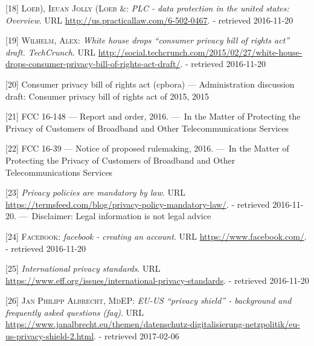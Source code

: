 \documentclass[12pt,english,a4paper,titlepage,cleardoublepage=empty,dottedtoc]{report}
\begin{document}
\hypertarget{ref-web_2016_data-protection-laws-in-the-us}{}
{[}18{]} \textsc{Loeb), Ieuan Jolly (Loeb \&}: \emph{PLC - data
protection in the united states: Overview}. URL
\url{http://us.practicallaw.com/6-502-0467}. - retrieved 2016-11-20

\hypertarget{ref-web_2015_white-house-releases-consumer-privacy-bill-draft}{}
{[}19{]} \textsc{Wilhelm, Alex}: \emph{White house drops ``consumer
privacy bill of rights act'' draft. TechCrunch}. URL
\url{http://social.techcrunch.com/2015/02/27/white-house-drops-consumer-privacy-bill-of-rights-act-draft/}.
- retrieved 2016-11-20

\hypertarget{ref-bill-draft_2015_us_consumer-privacy-bill-of-rights-act_definition}{}
{[}20{]} Consumer privacy bill of rights act (cpbora) --- Administration
discussion draft: Consumer privacy bill of rights act of 2015, 2015

\hypertarget{ref-rules_2016_fcc_to-protect-broadband-consumer-privacy_sensitive-types-of-data}{}
{[}21{]} FCC 16-148 --- Report and order, 2016. ---~In the Matter of
Protecting the Privacy of Customers of Broadband and Other
Telecommunications Services

\hypertarget{ref-rules_2016_fcc_to-protect-broadband-consumer-privacy_personally-identifiable-information}{}
{[}22{]} FCC 16-39 --- Notice of proposed rulemaking, 2016. ---~In the
Matter of Protecting the Privacy of Customers of Broadband and Other
Telecommunications Services

\hypertarget{ref-web_2016_privacy-policies-are-mandatory-by-law}{}
{[}23{]} \emph{Privacy policies are mandatory by law}. URL
\url{https://termsfeed.com/blog/privacy-policy-mandatory-law/}. -
retrieved 2016-11-20. ---~Disclaimer: Legal information is not legal
advice

\hypertarget{ref-web_2016_facebooks-landing-page_policy-acknowledgement}{}
{[}24{]} \textsc{Facebook}: \emph{facebook - creating an account}. URL
\url{https://www.facebook.com/}. - retrieved 2016-11-20

\hypertarget{ref-web_2016_international-privacy-standards}{}
{[}25{]} \emph{International privacy standards}. URL
\url{https://www.eff.org/issues/international-privacy-standards}. -
retrieved 2016-11-20

\hypertarget{ref-web_2017_privacy-shield_faq}{}
{[}26{]} \textsc{Jan Philipp Albrecht, MdEP}: \emph{EU-US ``privacy
shield'' - background and frequently asked questions (faq)}. URL
\url{https://www.janalbrecht.eu/themen/datenschutz-digitalisierung-netzpolitik/eu-us-privacy-shield-2.html}.
- retrieved 2017-02-06
\end{document}
